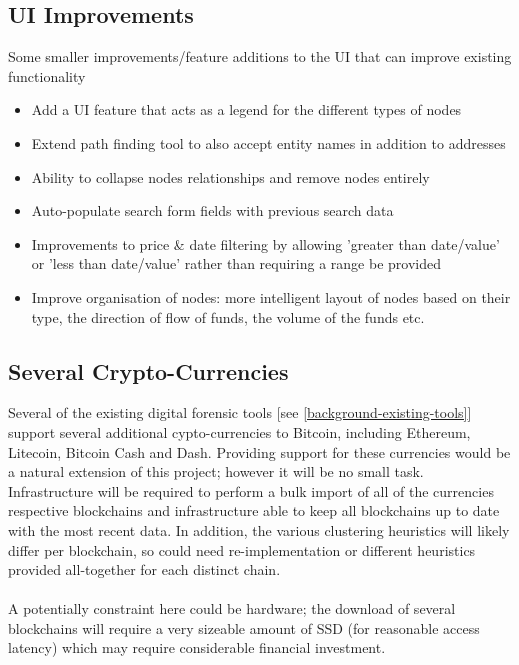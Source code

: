 \subsection{UI Improvements}
Some smaller improvements/feature additions to the UI that can improve existing functionality 
\begin{itemize}
    \item Add a UI feature that acts as a legend for the different types of nodes 
    \item Extend path finding tool to also accept entity names in addition to addresses
    \item Ability to collapse nodes relationships and remove nodes entirely 
    \item Auto-populate search form fields with previous search data 
    \item Improvements to price \& date filtering by allowing 'greater than date/value' or 'less than date/value' rather than requiring a range be provided
    \item Improve organisation of nodes: more intelligent layout of nodes based on their type, the direction of flow of funds, the volume of the funds etc. 
\end{itemize}

\subsection{Several Crypto-Currencies}
Several of the existing digital forensic tools [see \ref{background-existing-tools}] support several additional cypto-currencies to Bitcoin, including Ethereum, Litecoin, Bitcoin Cash and Dash. Providing support for these currencies would be a natural extension of this project; however it will be no small task. Infrastructure will be required to perform a bulk import of all of the currencies respective blockchains and infrastructure able to keep all blockchains up to date with the most recent data. In addition, the various clustering heuristics will likely differ per blockchain, so could need re-implementation or different heuristics provided all-together for each distinct chain. 
\\\\
A potentially constraint here could be hardware; the download of several blockchains will require a very sizeable amount of SSD (for reasonable access latency) which may require considerable financial investment. 

